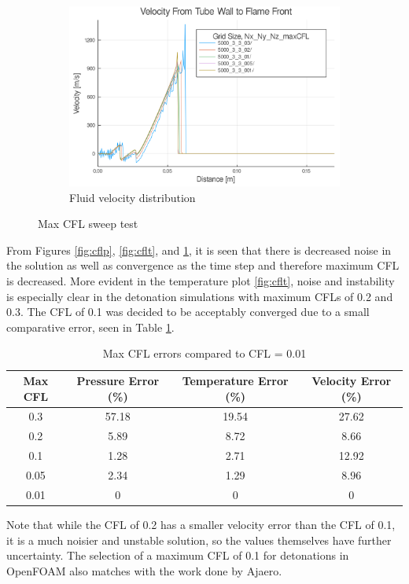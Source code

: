 \begin{figure}\ContinuedFloat
    \begin{subfigure}[]{\textwidth}
    \centering
    \includegraphics[width=\linewidth]{figs/cfl_test/u.png}
    \caption{Fluid velocity distribution}
    \label{fig:cflu}
    \end{subfigure}
    \caption{Max CFL sweep test}
    \label{fig:maxcfl}
\end{figure}



From Figures \ref{fig:cflp}, \ref{fig:cflt}, and \ref{fig:cflu}, it is seen that there is decreased noise in the solution as well as convergence as the time step and therefore maximum CFL is decreased. More evident in the temperature plot \ref{fig:cflt}, noise and instability is especially clear in the detonation simulations with maximum CFLs of 0.2 and 0.3. The CFL of 0.1 was decided to be acceptably converged due to a small comparative error, seen in Table \ref{tab:cflerror}. 
\begin{table}[]
\centering
\caption{Max CFL errors compared to CFL = 0.01}
\label{tab:cflerror}
\begin{tabular}{cccc}
Max CFL & Pressure Error (\%) & Temperature Error (\%) & Velocity Error (\%) \\ \hline
0.3 & 57.18 & 19.54 & 27.62 \\ 
0.2 & 5.89 & 8.72 & 8.66 \\
0.1 & 1.28 & 2.71 & 12.92 \\
0.05 & 2.34 & 1.29 & 8.96 \\
0.01 & 0 & 0 & 0 \\
\end{tabular}
\end{table}%
\noindent Note that while the CFL of 0.2 has a smaller velocity error than the CFL of 0.1, it is a much noisier and unstable solution, so the values themselves have further uncertainty. The selection of a maximum CFL of 0.1  for detonations in OpenFOAM also matches with the work done by Ajaero\cite{ajaero}. 

